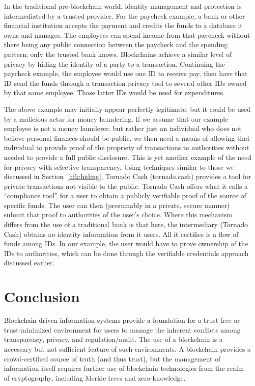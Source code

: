 \documentclass[11pt,dvipdfm]{article}
\begin{document}
In the traditional pre-blockchain world, identity management and protection is intermediated by a trusted provider.
For the paycheck example, a bank or other financial institution accepts the payment and credits the funds to
a database it owns and manages.  The employees can spend income from that paycheck without there being
any public connection between the paycheck and the spending pattern; only the trusted bank knows.
Blockchains achieve a similar level of privacy by hiding the identity of a party to a transaction.  
Continuing the paycheck example, the employee would use one ID to receive pay, then have that ID
send the funds through a transaction privacy tool to several other IDs owned by that same employee.  Those latter
IDs would be used for expenditures.

The above example may initially appear perfectly legitimate, but it could be used by a malicious actor for
money laundering.  
If we assume that our example employee is not a money launderer, but rather just an individual who does not
believe personal finances should be public, we then need a means of allowing that
individual to provide proof of the propriety of transactions to authorities without needed to provide a full
public disclosure.
This is yet another example of the need for privacy with selective transparency.
Using techniques similar to those we discussed in Section~\ref{hfk:hiding}, Tornado Cash (tornado.cash)
provides a tool for private transactions not visible to the public.  
Tornado Cash offers what it calls a ``compliance tool'' for a user to obtain a publicly verifiable proof of the source of
specific funds.  The user can then (presumably in a private, secure manner) submit that proof to authorities of
the user's choice.
Where this mechanism differs from the use of a traditional bank is that here, the intermediary
(Tornado Cash) obtains no
identity information from it users. 
All it certifies is a flow of funds among IDs.
In our example, the user would have to prove ownership of the IDs to authorities, which can be done through
the verifiable credentials approach discussed earlier.

\section {Conclusion}
Blockchain-driven information systems provide a foundation for a trust-free or trust-minimized environment 
for users to manage the inherent conflicts among transparency, privacy, and regulation/audit.
The use of a blockchain is a necessary but not sufficient feature of such environments.
A blockchain provides a crowd-certified source of truth (and thus trust), but the management of
information itself requires further use of blockchain technologies from the realm of cryptography, including
Merkle trees and zero-knowledge.
\end{document}
